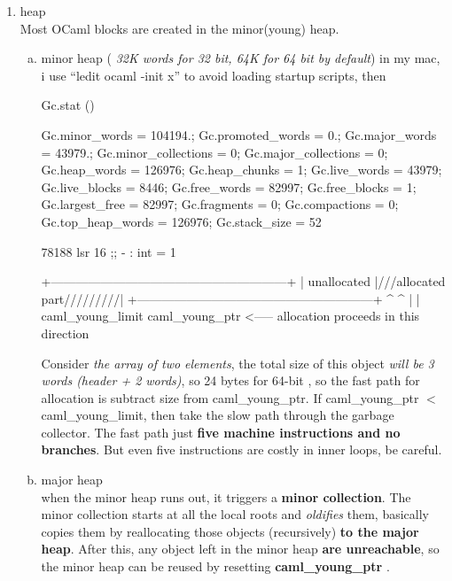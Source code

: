 \begin{enumerate}
\item heap \\
  Most OCaml blocks are created in the minor(young) heap.
  \begin{enumerate}[(a)]
  \item minor heap ( \textit{32K words for 32 bit, 64K for 64 bit by default})
    in my mac,  i use ``ledit ocaml -init x'' to avoid loading startup
    scripts, then 
\begin{alternate}
Gc.stat ()
\end{alternate}
\begin{bluecode}
{Gc.minor_words = 104194.; Gc.promoted_words = 0.; Gc.major_words = 43979.;
 Gc.minor_collections = 0; Gc.major_collections = 0; Gc.heap_words = 126976;
 Gc.heap_chunks = 1; Gc.live_words = 43979; Gc.live_blocks = 8446;
 Gc.free_words = 82997; Gc.free_blocks = 1; Gc.largest_free = 82997;
 Gc.fragments = 0; Gc.compactions = 0; Gc.top_heap_words = 126976;
 Gc.stack_size = 52}  
\end{bluecode}

\begin{alternate}
78188 lsr 16 ;;
- : int = 1
\end{alternate}


    

\begin{bluetext}
+---------------------------------------------------------+
| unallocated                  |///allocated part/////////|
+---------------------------------------------------------+
 ^                              ^
 |                              |
caml_young_limit             caml_young_ptr
                      <----- allocation proceeds
                            in this direction
\end{bluetext}

    
    Consider \textit{the array of two elements}, the total size of this object \textit{will be 3 words (header + 2 words)}, so 24 bytes for 64-bit , so the fast path for allocation is
    subtract size from caml\_young\_ptr.
    If caml\_young\_ptr $<$ caml\_young\_limit, then take the slow path through the garbage collector.
    The fast path just \textbf{ five machine instructions and no branches}. But even
    five instructions are costly in inner loops, be careful.
  \item major heap \\
    when the minor heap runs out, it triggers a \textbf{minor collection}. The minor
    collection starts at all the local roots and \textit{oldifies} them, basically copies
    them by reallocating those objects (recursively) \textbf{ to the major heap}. After
    this, any object left in the minor heap \textbf{ are unreachable}, so the minor heap
    can be reused by resetting \textbf{ caml\_young\_ptr }.


\end{enumerate}
\end{enumerate}
